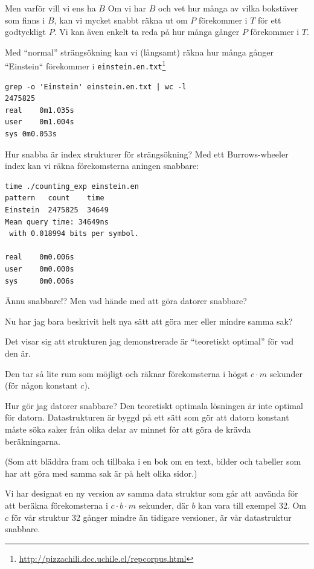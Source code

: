 \documentclass[11pt, aspectratio=169, table]{beamer}
\begin{document}
\begin{frame}[fragile]{Men varför vill vi ens ha $B$}
\setlength{\parskip}{\fill}
Om vi har $B$ och vet hur många av vilka bokstäver som finns i $B$, kan vi mycket snabbt räkna ut om $P$ 
förekommer i $T$ för ett godtyckligt $P$. Vi kan även enkelt ta reda på hur många gånger $P$ förekommer i $T$.

Med ``normal'' strängsökning kan vi (långsamt) räkna hur många gånger ``Einstein`` förekommer 
i \texttt{einstein.en.txt}\footnote{\url{http://pizzachili.dcc.uchile.cl/repcorpus.html}} 

\begin{verbatim}
grep -o 'Einstein' einstein.en.txt | wc -l
2475825
real	0m1.035s
user	0m1.004s
sys	0m0.053s
\end{verbatim}
\end{frame}

\begin{frame}[fragile]{Hur snabba är index strukturer för strängsökning?}
Med ett \alert{Burrows-wheeler} index kan vi räkna förekomsterna aningen snabbare:

\begin{verbatim}
time ./counting_exp einstein.en
pattern   count    time
Einstein  2475825  34649
Mean query time: 34649ns
 with 0.018994 bits per symbol.

real    0m0.006s
user    0m0.000s
sys     0m0.006s
\end{verbatim}
\end{frame}

\begin{frame}{Ännu snabbare!?}
\setlength{\parskip}{\fill}
Men vad hände med att göra datorer snabbare?

Nu har jag bara beskrivit helt nya sätt att göra mer eller mindre samma sak?

Det visar sig att strukturen jag demonstrerade  är ``teoretiskt optimal'' för vad den är.

Den tar så lite rum som möjligt och räknar förekomsterna i högst $c\cdot m$ sekunder (för någon konstant $c$).
\end{frame}

\begin{frame}{Hur gör jag datorer snabbare?}
\setlength{\parskip}{\fill}
Den teoretiskt optimala lösningen är inte optimal för datorn. 
Datastrukturen är byggd på ett sätt som gör att datorn konstant måste söka saker från olika delar av 
minnet för att göra de krävda beräkningarna.

(Som att bläddra fram och tillbaka i en bok om en text, bilder och tabeller som har att göra med samma sak är på helt olika sidor.)

Vi har designat en ny version av samma data struktur som går att använda för att beräkna förekomsterna i $c\cdot b \cdot m$ sekunder, 
där $b$ kan vara till exempel 32. Om $c$ för vår struktur 32 gånger mindre än tidigare versioner, är vår datastruktur snabbare.
\end{frame}
\end{document}
